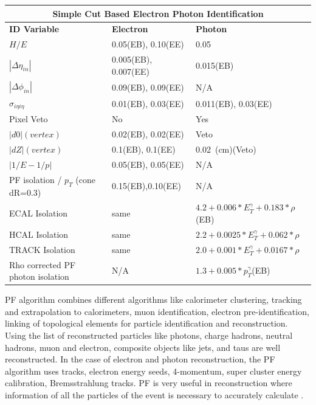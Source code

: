 \begin{center}
\centering
\begin{tabular}{l|l|p{3.2cm}} %
  \multicolumn{3}{c}{\bfseries{Simple Cut Based Electron Photon Identification}} \\
  \toprule
  \bfseries{ID Variable} & \bfseries{Electron} & \bfseries{Photon} \\
   \hline \hline 
  $H/E$ & 0.05(EB), 0.10(EE)  & 0.05 \\
  \hline
  $|\Delta \eta_{in}|$ & 0.005(EB), 0.007(EE)  & 0.015(EB)  \\
  \hline
   $|\Delta \phi_{in}|$ & 0.09(EB), 0.09(EE)  & N/A \\ \hline
   $\sigma_{i\eta i\eta}$ & 0.01(EB), 0.03(EE) & 0.011(EB), 0.03(EE)  \\
   \hline
   Pixel Veto & No & Yes \\
   \hline
   $|d0|(vertex)$ & 0.02(EB), 0.02(EE) &  Veto \\
   \hline
    $|dZ|(vertex)$ & 0.1(EB), 0.1(EE) & 0.02~(cm)(Veto) \\
    \hline
     $|1/E - 1/p|$ & 0.05(EB), 0.05(EE) & N/A \\
     \hline
     PF isolation / $p_{T}$ (cone dR=0.3) & 0.15(EB),0.10(EE) &  N/A \\
     \hline
     ECAL Isolation & same  & $4.2 + 0.006*E^{\gamma}_{T} + 0.183*\rho$(EB) \\
     \hline
     HCAL Isolation & same & $2.2 + 0.0025*E^{\gamma}_{T} + 0.062*\rho$ \\
     \hline
     TRACK Isolation & same  & $2.0 + 0.001*E^{\gamma}_{T} + 0.0167*\rho$ \\
     \hline
     Rho corrected PF photon isolation & N/A & $1.3 + 0.005*p^{\gamma}_{T}$(EB) \\      
   \hline
   \bottomrule
  \end{tabular}
 \label{tab:EgammaID} %
 \end{center}

PF algorithm combines different algorithms like calorimeter clustering,  tracking and extrapolation to calorimeters, muon identification, electron pre-identification, linking of topological elements for particle identification and reconstruction. Using the list of reconstructed particles like photons, charge hadrons, neutral hadrons, muon and electron, composite objects like jets, \MET and taus are well reconstructed.
In the case of electron and photon reconstruction, the PF algorithm uses tracks, electron energy seeds, 4-momentum, super cluster energy calibration, Bremsstrahlung tracks. PF is very useful in \MET reconstruction where information of all the particles of the event is necessary to accurately calculate \MET.





